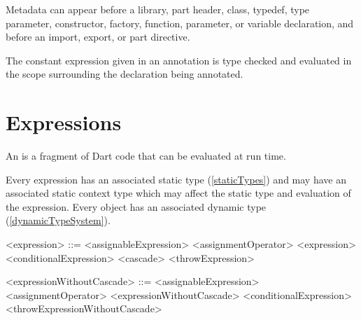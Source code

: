 \documentclass[makeidx]{article}
\begin{document}
{


\LMHash{}%
Metadata can appear before a library, part header, class,
typedef, type parameter, constructor, factory, function,
parameter, or variable declaration,
and before an import, export, or part directive.

\LMHash{}%
The constant expression given in an annotation is type checked and evaluated
in the scope surrounding the declaration being annotated.


\section{Expressions}

\LMHash{}%
An  is a fragment of Dart code
that can be evaluated at run time.

\LMHash{}%
Every expression has an associated static type (\ref{staticTypes}) and
may have an associated static context type
which may affect the static type and evaluation of the expression.
Every object has an associated dynamic type (\ref{dynamicTypeSystem}).


\begin{grammar}
<expression> ::= <assignableExpression> <assignmentOperator> <expression>
  \alt <conditionalExpression>
  \alt <cascade>
  \alt <throwExpression>

<expressionWithoutCascade> ::= \gnewline{}
  <assignableExpression> <assignmentOperator> <expressionWithoutCascade>
  \alt <conditionalExpression>
  \alt <throwExpressionWithoutCascade>


\end{grammar}}
\end{document}
